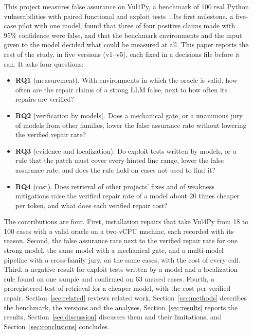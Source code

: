 \documentclass[ai,article,submit,oneauthor]{Definitions/mdpi}
\begin{document}
This project measures false assurance on Vul4Py, a benchmark of 100 real Python vulnerabilities with paired functional and exploit tests~\cite{Bui2026Vul4pyBenchmarkingAutomated}. Its first milestone, a five-case pilot with one model, found that three of four positive claims made with 95\% confidence were false, and that the benchmark environments and the input given to the model decided what could be measured at all. This paper reports the rest of the study, in five versions (v1--v5), each fixed in a decisions file before it ran. It asks four questions:
\begin{itemize}
\item[] \textbf{RQ1} (measurement). With environments in which the oracle is valid, how often are the repair claims of a strong LLM false, next to how often its repairs are verified?
\item[] \textbf{RQ2} (verification by models). Does a mechanical gate, or a unanimous jury of models from other families, lower the false assurance rate without lowering the verified repair rate?
\item[] \textbf{RQ3} (evidence and localization). Do exploit tests written by models, or a rule that the patch must cover every hinted line range, lower the false assurance rate, and does the rule hold on cases not used to find it?
\item[] \textbf{RQ4} (cost). Does retrieval of other projects' fixes and of weakness mitigations raise the verified repair rate of a model about 20 times cheaper per token, and what does each verified repair cost?
\end{itemize}

The contributions are four. First, installation repairs that take Vul4Py from 18 to 100 cases with a valid oracle on a two-vCPU machine, each recorded with its reason. Second, the false assurance rate next to the verified repair rate for one strong model, the same model with a mechanical gate, and a multi-model pipeline with a cross-family jury, on the same cases, with the cost of every call. Third, a negative result for exploit tests written by a model and a localization rule found on one sample and confirmed on 63 unused cases. Fourth, a preregistered test of retrieval for a cheaper model, with the cost per verified repair. Section~\ref{sec:related} reviews related work, Section~\ref{sec:methods} describes the benchmark, the versions and the analyses, Section~\ref{sec:results} reports the results, Section~\ref{sec:discussion} discusses them and their limitations, and Section~\ref{sec:conclusions} concludes.
\end{document}
